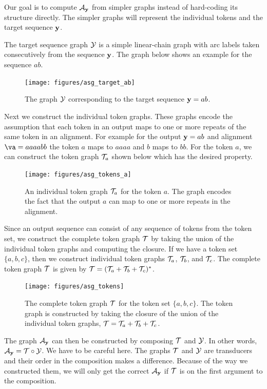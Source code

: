 Our goal is to compute $\mathcal{A}_{\bf y}$ from simpler graphs instead of hard-coding its
structure directly. The simpler graphs will represent the individual tokens and
the target sequence ${\bf y}$.

The target sequence graph $\mathcal{Y}$ is a simple linear-chain graph with arc labels
taken consecutively from the sequence ${\bf y}$. The graph below shows an example
for the sequence $ab$.

\begin{figure}
    \centering
    \texttt{[image: figures/asg\_target\_ab]}
    \caption{The graph $\mathcal{Y}$ corresponding to the target sequence ${\bf y} = ab$.}
    \label{fig:asg_target_ab}
\end{figure}

Next we construct the individual token graphs. These graphs encode the
assumption that each token in an output maps to one or more repeats of the same
token in an alignment. For example for the output ${\bf y} = ab$ and alignment $\va
= aaaabb$ the token $a$ maps to $aaaa$ and $b$ maps to  $bb$. For the token
$a$, we can construct the token graph $\mathcal{T}_a$ shown below which has the desired
property.

\begin{figure}
    \centering
    \texttt{[image: figures/asg\_tokens\_a]}
    \caption{An individual token graph $\mathcal{T}_a$ for the token $a$. The graph
    encodes the fact that the output $a$ can map to one or more repeats in the
    alignment.}
    \label{fig:asg_tokens_a}
\end{figure}

Since an output sequence can consist of any sequence of tokens from the token
set, we construct the complete token graph $\mathcal{T}$ by taking the union of the
individual token graphs and computing the closure. If we have a token set $\{a,
b, c\}$, then we construct individual token graphs $\mathcal{T}_a$, $\mathcal{T}_b$, and
$\mathcal{T}_c$. The complete token graph $\mathcal{T}$ is given by $\mathcal{T} = (\mathcal{T}_a + \mathcal{T}_b +
\mathcal{T}_c)^*$.

\begin{figure}
    \centering
    \texttt{[image: figures/asg\_tokens]}
    \caption{The complete token graph $\mathcal{T}$ for the token set $\{a, b, c\}$.
    The token graph is constructed by taking the closure of the union of the
    individual token graphs, $\mathcal{T} = \mathcal{T}_a + \mathcal{T}_b + \mathcal{T}_c$.}
    \label{fig:asg_tokens}
\end{figure}

The graph $\mathcal{A}_{\bf y}$ can then be constructed by composing $\mathcal{T}$ and $\mathcal{Y}$. In
other words, $\mathcal{A}_{\bf y} = \mathcal{T} \circ \mathcal{Y}$. We have to be careful here. The graphs
$\mathcal{T}$ and $\mathcal{Y}$ are transducers and their order in the composition makes a
difference. Because of the way we constructed them, we will only get the
correct $\mathcal{A}_{\bf y}$ if $\mathcal{T}$ is on the first argument to the composition.

